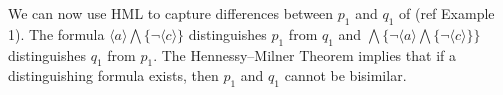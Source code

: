\begin{isabellebody}
\begin{isamarkuptext}
We can now use HML to capture differences between $p_1$ and $q_1$ of (ref Example 1). The formula
$\langle a \rangle\bigwedge\{\lnot\langle c \rangle\}$ distinguishes $p_1$ from $q_1$ and $\bigwedge\{\lnot\langle a \rangle\bigwedge\{\lnot\langle c \rangle\}\}$ distinguishes
$q_1$ from $p_1$. The Hennessy–Milner Theorem implies that if a distinguishing formula exists, then $p_1$ and $q_1$ cannot be bisimilar.%
\end{isamarkuptext}\isamarkuptrue%
%
\isadelimvisible
%
\endisadelimvisible
%
\isatagvisible
%
\endisatagvisible
{\isafoldvisible}%
%
\isadelimvisible
%
\endisadelimvisible
%
\isadelimdocument
%
\endisadelimdocument
%
\isatagdocument
%
\endisatagdocument
{\isafolddocument}%
%
\isadelimdocument
%
\endisadelimdocument
%
\isadelimvisible
%
\endisadelimvisible
%
\isatagvisible
%
\endisatagvisible
{\isafoldvisible}%
%
\isadelimvisible
%
\endisadelimvisible
%
\isadelimtheory
%
\endisadelimtheory
%
\isatagtheory
%
\endisatagtheory
{\isafoldtheory}%
%
\isadelimtheory
%
\endisadelimtheory
%
\end{isabellebody}%
\endinput
